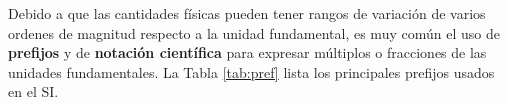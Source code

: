 Debido a que las cantidades f\'isicas pueden tener rangos de variaci\'on de varios ordenes de magnitud respecto a la unidad fundamental, es muy com\'un el uso de \textbf{prefijos} y de \textbf{notaci\'on cient\'ifica} para expresar m\'ultiplos o fracciones de las unidades fundamentales. La Tabla \ref{tab:pref} lista los principales prefijos usados en el SI.\\[.5cm]

